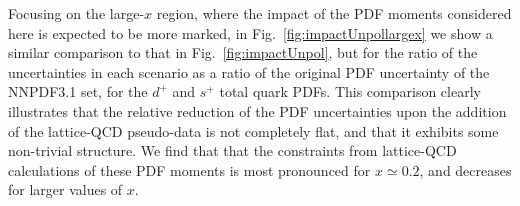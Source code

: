




Focusing on the large-$x$ region, where the
impact of the PDF moments considered here
is expected to be more marked, in
Fig.~\ref{fig:impactUnpollargex} we show a similar comparison
to that in Fig.~\ref{fig:impactUnpol}, but for the ratio 
of the uncertainties in each scenario as a ratio of the original PDF 
uncertainty of the NNPDF3.1 set, for the $d^+$
and $s^+$ total quark PDFs.
%
This comparison clearly illustrates that the relative reduction
of the PDF uncertainties upon the addition of the lattice-QCD
pseudo-data is not completely flat, and that it exhibits some
non-trivial structure.
%
We find that that the constraints from lattice-QCD calculations of these 
PDF moments is most pronounced for $x \simeq 0.2$, and decreases for larger 
values of $x$.


